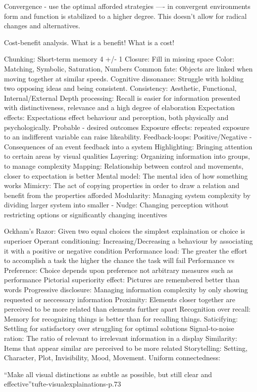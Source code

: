 
Convergence - use the optimal afforded strategies ---- in convergent environments form and function is stabilized to a higher degree. This doesn't allow for radical changes and alternatives. 

Cost-benefit analysis. What is a benefit! What is a cost!

Chunking: Short-term memory 4 +/- 1
Closure: Fill in missing space
Color: Matching, Symbolic, Saturation, Numbers
Common fate: Objects are linked when moving together at similar speeds.
Cognitive dissonance: Struggle with holding two opposing ideas and being consistent.
Consistency: Aesthetic, Functional, Internal/External
Depth processing: Recall is easier for information presented with distinctiveness, relevance and a high degree of elaboration
Expectation effects: Expectations effect behaviour and perception, both physically and psychologically. Probable - desired outcomes
Exposure effects: repeated exposure to an indifferent variable can raise likeability.
Feedback-loops: Positive/Negative - Consequences of an event feedback into a system
Highlighting: Bringing attention to certain areas by visual qualities
Layering: Organizing information into groups, to manage complexity
Mapping: Relationship between control and movements, closer to expectation is better
Mental model: The mental idea of how something works
Mimicry: The act of copying properties in order to draw a relation and benefit from the properties afforded 
Modularity: Managing system complexity by dividing larger system into smaller -
Nudge: Changing perception without restricting options or significantly changing incentives
 
Ockham's Razor: Given two equal choices the simplest explaination or choice is superioer
Operant conditioning: Increasing/Decreasing a behaviour by associating it with a positive or negative condition
Performance load: The greater the effort to accomplish a task the higher the chance the task will fail
Performance vs Preference: Choice depends upon preference not arbitrary measures such as performance
Pictorial superiority effect: Pictures are remembered better than words
Progressive disclosure: Managing information complexity by only showing requested or neccessary information
Proximity: Elements closer together are perceived to be more related than elements further apart
Recognition over recall: Memory for recognizing things is better than for recalling things.
Saticifying: Settling for satisfactory over struggling for optimal solutions
Signal-to-noise ration: The ratio of relevant to irrelevant information in a display
Similarity: Items that appear similar are perceived to be more related
Storytelling: Setting, Character, Plot, Invisibility, Mood, Movement.
Uniform connectedness: 


``Make all visual distinctions as subtle as possible, but still clear and effective''tufte-visualexplainations-p.73
